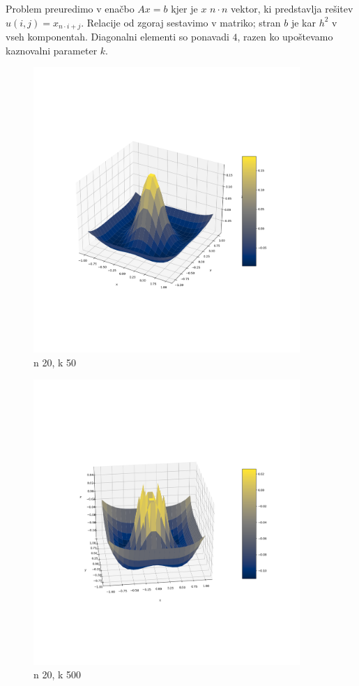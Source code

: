 \documentclass{article}
\begin{document}
    Problem preuredimo v enačbo \(Ax=b\) kjer je \(x\) \(n\cdot n\) vektor, ki predstavlja rešitev \(u(i,j) = x_{n\cdot i+j}\). Relacije od zgoraj sestavimo v matriko; stran \(b\) je kar \(h^2\) v vseh komponentah. Diagonalni elementi so ponavadi \(4\), razen ko upoštevamo kaznovalni parameter \(k\).

    \begin{figure}[h!]
        \centering
        \includegraphics[width=0.9\textwidth]{nal1_n20_k50.png}
        \caption{n 20, k 50}
    \end{figure}

    \begin{figure}[h!]
        \centering
        \includegraphics[width=0.9\textwidth]{nal1_n20_k500.png}
        \caption{n 20, k 500}
    \end{figure}
\end{document}
